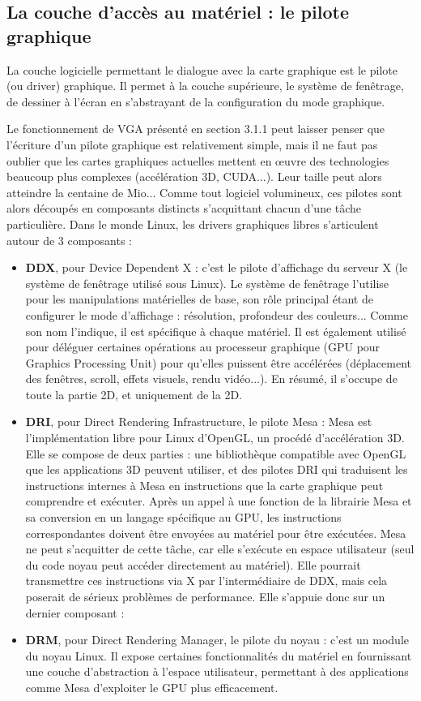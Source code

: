 \subsection{La couche d'accès au matériel : le pilote graphique}

La couche logicielle permettant le dialogue avec la carte graphique est le pilote (ou driver) graphique. Il permet à la couche supérieure, le système de fenêtrage, de dessiner à l'écran en s'abstrayant de la configuration du mode graphique.

Le fonctionnement de VGA présenté en section 3.1.1 peut laisser penser que l'écriture d'un pilote graphique est relativement simple, mais il ne faut pas oublier que les cartes graphiques actuelles mettent en œuvre des technologies beaucoup plus complexes (accélération 3D, CUDA...). Leur taille peut alors atteindre la centaine de Mio... Comme tout logiciel volumineux, ces pilotes sont alors découpés en composants distincts s'acquittant chacun d'une tâche particulière. Dans le monde Linux, les drivers graphiques libres s'articulent autour de 3 composants \cite{GraphStack} :
\begin{itemize} \vspace{1ex} \itemsep1ex
 \item \textbf{DDX}, pour Device Dependent X : c'est le pilote d'affichage du serveur X (le système de fenêtrage utilisé sous Linux). Le système de fenêtrage l'utilise pour les manipulations matérielles de base, son rôle principal étant de configurer le mode d'affichage : résolution, profondeur des couleurs... Comme son nom l'indique, il est spécifique à chaque matériel. Il est également utilisé pour déléguer certaines opérations au processeur graphique (GPU pour Graphics Processing Unit) pour qu'elles puissent être accélérées (déplacement des fenêtres, scroll, effets visuels, rendu vidéo...). En résumé, il s'occupe de toute la partie 2D, et uniquement de la 2D.
 \item \textbf{DRI}, pour Direct Rendering Infrastructure, le pilote Mesa : Mesa est l'implémentation libre pour Linux d'OpenGL, un procédé d'accélération 3D. Elle se compose de deux parties : une bibliothèque compatible avec OpenGL que les applications 3D peuvent utiliser, et des pilotes DRI qui traduisent les instructions internes à Mesa en instructions que la carte graphique peut comprendre et exécuter. Après un appel à une fonction de la librairie Mesa et sa conversion en un langage spécifique au GPU, les instructions correspondantes doivent être envoyées au matériel pour être exécutées. Mesa ne peut s'acquitter de cette tâche, car elle s'exécute en espace utilisateur (seul du code noyau peut accéder directement au matériel). Elle pourrait transmettre ces instructions via X par l'intermédiaire de DDX, mais cela poserait de sérieux problèmes de performance. Elle s'appuie donc sur un dernier composant :
 \item \textbf{DRM}, pour Direct Rendering Manager, le pilote du noyau : c'est un module du noyau Linux. Il expose certaines fonctionnalités du matériel en fournissant une couche d'abstraction à l'espace utilisateur, permettant à des applications comme Mesa d'exploiter le GPU plus efficacement.
\end{itemize}

